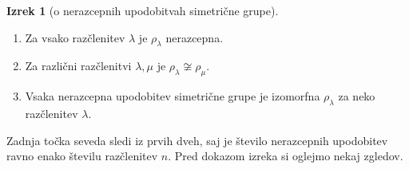 \documentclass[11pt]{book}
\theoremstyle{definition}
\theoremstyle{zgled}
\theoremstyle{odprtproblem}
\theoremstyle{domacanaloga}
\theoremstyle{izrek}
\newtheorem*{izrek}{Izrek}
\begin{document}
\begin{izrek}[o nerazcepnih upodobitvah simetrične grupe] \leavevmode
\begin{enumerate}
    \item Za vsako razčlenitev $\lambda$ je $\rho_{\lambda}$ nerazcepna.
    \item Za različni razčlenitvi $\lambda, \mu$ je $\rho_{\lambda} \not\cong \rho_{\mu}$.
    \item Vsaka nerazcepna upodobitev simetrične grupe je izomorfna $\rho_{\lambda}$ za neko razčlenitev $\lambda$.
\end{enumerate}
\end{izrek}

Zadnja točka seveda sledi iz prvih dveh, saj je število nerazcepnih upodobitev ravno enako številu razčlenitev $n$. Pred dokazom izreka si oglejmo nekaj zgledov.
\end{document}
